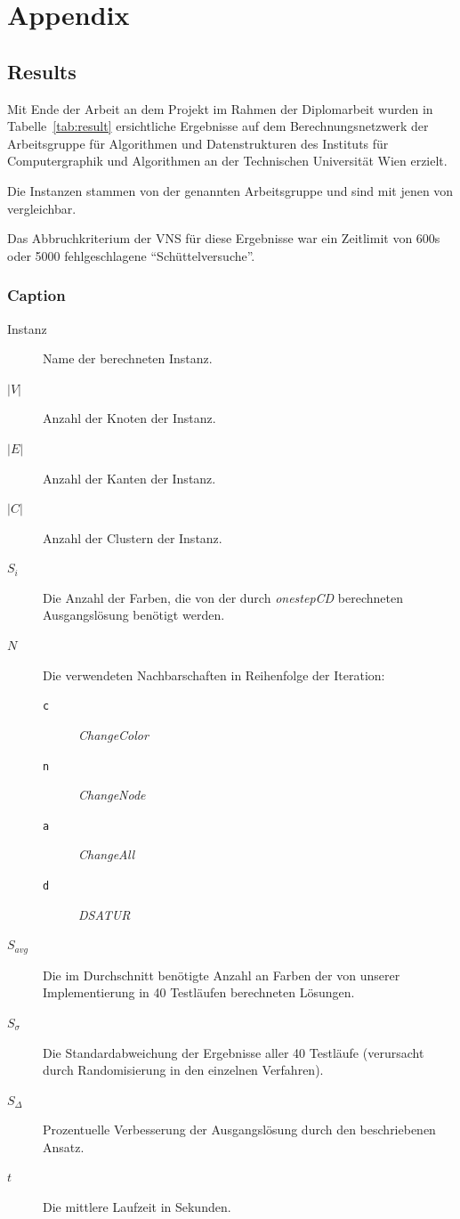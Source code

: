 \documentclass[paper=a4,fontsize=12pt]{scrartcl}
\let\origappendix\appendix
\renewcommand\appendix{\clearpage\pagenumbering{roman}\origappendix}
\begin{document}

\appendix

\section{Appendix}

\subsection{Results}

Mit Ende der Arbeit an dem Projekt im Rahmen der Diplomarbeit wurden in Tabelle~\ref{tab:result} ersichtliche Ergebnisse auf dem Berechnungsnetzwerk der Arbeitsgruppe für Algorithmen und Datenstrukturen des Instituts für Computergraphik und Algorithmen an der Technischen Universität Wien erzielt.

Die Instanzen stammen von der genannten Arbeitsgruppe und sind mit jenen von \cite{Noronha2006} vergleichbar.

Das Abbruchkriterium der VNS für diese Ergebnisse war ein Zeitlimit von 600s oder 5000 fehlgeschlagene \enquote{Schüttelversuche}.


\subsubsection*{Caption}

\begin{description}
    \item[Instanz] Name der berechneten Instanz.
    \item[$|V|$] Anzahl der Knoten der Instanz.
    \item[$|E|$] Anzahl der Kanten der Instanz.
    \item[$|C|$] Anzahl der Clustern der Instanz.
    \item[$S_i$] Die Anzahl der Farben, die von der durch \emph{onestepCD} berechneten Ausgangslösung benötigt werden.
    \item[$N$] Die verwendeten Nachbarschaften in Reihenfolge der Iteration:
        \begin{description}
            \item[\texttt{c}] \emph{ChangeColor}
            \item[\texttt{n}] \emph{ChangeNode}
            \item[\texttt{a}] \emph{ChangeAll}
            \item[\texttt{d}] \emph{DSATUR}
        \end{description}
    \item[$S_{avg}$] Die im Durchschnitt benötigte Anzahl an Farben der von unserer Implementierung in 40 Testläufen berechneten Lösungen.
    \item[$S_{\sigma}$] Die Standardabweichung der Ergebnisse aller 40 Testläufe (verursacht durch Ran\-dom\-isier\-ung in den einzelnen Verfahren).
    \item[$S_{\Delta}$] Prozentuelle Verbesserung der Ausgangslösung durch den beschriebenen Ansatz.
    \item[$t$] Die mittlere Laufzeit in Sekunden.
\end{description}
\end{document}

